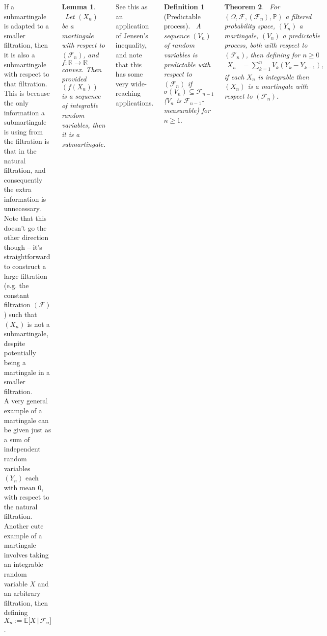 \documentclass{tikzposter} %
\newtheorem{theorem}{Theorem}
\newtheorem{lemma}[theorem]{Lemma}
\newtheorem{definition}{Definition}
\begin{document}
\begin{columns}
{    If a submartingale is adapted to a smaller filtration, then it is also a submartingale with respect to that filtration. This is because the only information a submartingale is using from the filtration is that in the natural filtration, and consequently the extra information is unnecessary. Note that this doesn't go the other direction though -- it's straightforward to construct a large filtration (e.g. the constant filtration $(\mathcal{F})$) such that $(X_{n})$ is not a submartingale, despite potentially being a martingale in a smaller filtration. \\

    A very general example of a martingale can be given just as a sum of independent random variables $(Y_{n})$ each with mean $0$, with respect to the natural filtration. Another cute example of a martingale involves taking an integrable random variable $X$ and an arbitrary filtration, then defining $X_{n} := \mathbb{E}\big[X \,|\, \mathcal{F}_{n}\big]$. \\

    \begin{lemma}
    \ Let $(X_{n})$ be a martingale with respect to $(\mathcal{F}_{n})$, and $f : \mathbb{R} \to \mathbb{R}$ convex. Then provided $(f(X_{n}))$ is a sequence of integrable random variables, then it is a submartingale.
    \end{lemma}
    \hphantom{}

    See this as an application of Jensen's inequality, and note that this has some very wide-reaching applications. \\

    \begin{definition}[Predictable process]
    \ A sequence $(V_{n})$ of random variables is predictable with respect to $(\mathcal{F}_{n})$ if $\sigma(V_{n}) \subseteq \mathcal{F}_{n-1}$ ($V_{n}$ is $\mathcal{F}_{n-1}$-measurable) for $n \ge 1$.
    \end{definition}
    \hphantom{}

    \begin{theorem}
    \ For $(\Omega, \mathcal{F}, (\mathcal{F}_{n}), \mathbb{P})$ a filtered probability space, $(Y_{n})$ a martingale, $(V_{n})$ a predictable process, both with respect to $(\mathcal{F}_{n})$, then defining for $n \ge 0$
    \begin{align*}
      X_{n} &= \sum_{k=1}^{n} V_{k}(Y_{k}-Y_{k-1}),
    \end{align*}
    if each $X_{n}$ is integrable then $(X_{n})$ is a martingale with respect to $(\mathcal{F}_{n})$.
    \end{theorem}
    \hphantom{}

}
\end{columns}
\end{document}
